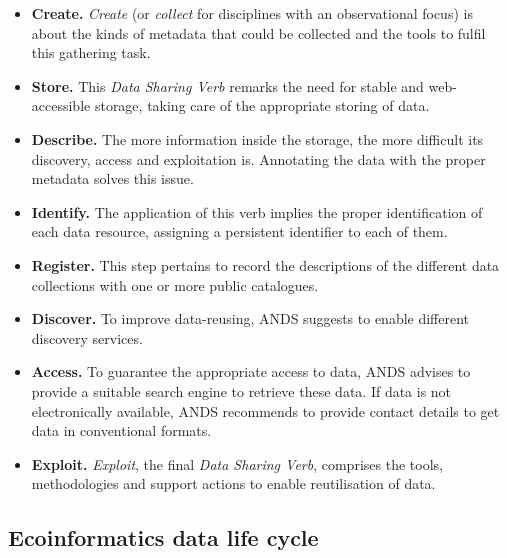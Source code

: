 \begin{itemize}
    \item \textbf{Create.} \textit{Create} (or \textit{collect} for disciplines with an observational focus) is about the kinds of metadata  that could be collected and the tools to fulfil this gathering task.
    \item \textbf{Store.} This \textit{Data Sharing Verb} remarks the need for stable and web-accessible storage, taking care of the appropriate storing of data.
    \item \textbf{Describe.} The more information inside the storage, the more difficult its discovery, access and exploitation is. Annotating the data with the proper metadata solves this issue.
    \item \textbf{Identify.} The application of this verb implies the proper identification of each data resource, assigning a persistent identifier to each of them.
    \item \textbf{Register.} This step pertains to record the descriptions of the different data collections with one or more public catalogues.
    \item \textbf{Discover.} To improve data-reusing, ANDS suggests to enable different discovery services.
    \item \textbf{Access.} To guarantee the appropriate access to data, ANDS advises to provide a suitable search engine to retrieve these data. If data is not electronically available, ANDS recommends to provide contact details to get data in conventional formats.
    \item \textbf{Exploit.} \textit{Exploit}, the final \textit{Data Sharing Verb}, comprises the tools, methodologies and support actions to enable reutilisation of data.
\end{itemize}

\subsection{Ecoinformatics data life cycle}

